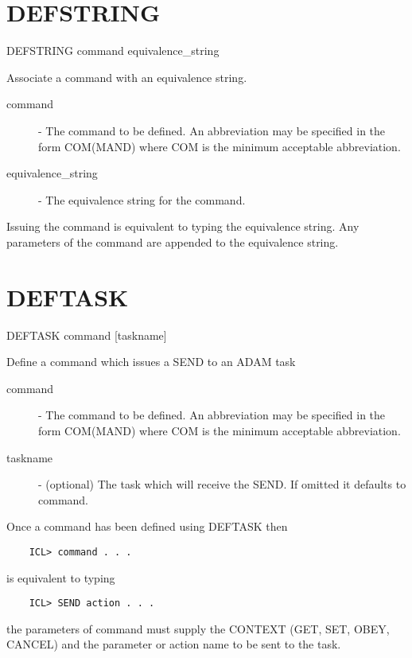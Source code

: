 \documentclass[twoside,11pt]{report}
\newcommand{\xlabel}[1]{}
\begin{document}
\section{\xlabel{DEFSTRING}DEFSTRING\label{DEFSTRING}}

   DEFSTRING \hspace{.5cm} command \hspace{.5cm} equivalence\_string

 Associate a command with an equivalence string.

\begin{description}

\item[command] - The command to be defined. An abbreviation
              may be specified in the form COM(MAND) where
              COM is the minimum acceptable abbreviation.

\item[equivalence\_string] - The equivalence string for the command.

\end{description}
Issuing the command is equivalent to typing the equivalence string. Any
parameters of the command are appended to the equivalence string.

\section{\xlabel{DEFTASK}DEFTASK\label{DEFTASK}}

   DEFTASK \hspace{.5cm} command \hspace{.5cm} [taskname]

 Define a command which issues a SEND to an ADAM task

\begin{description}

\item[command] - The command to be defined. An abbreviation
              may be specified in the form COM(MAND) where
              COM is the minimum acceptable abbreviation.

\item[taskname] - (optional) The task which will receive the SEND.
              If omitted it defaults to command.

\end{description}
Once a command has been defined using DEFTASK then
\begin{verbatim}
    ICL> command . . .
\end{verbatim}
is equivalent to typing
\begin{verbatim}
    ICL> SEND action . . .
\end{verbatim}
the parameters of command must supply the CONTEXT (GET, SET, OBEY, CANCEL)
and the parameter or action name to be sent to the task.
\end{document}
